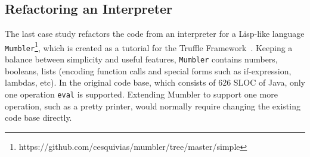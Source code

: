 \begin{comment}
\subsection{Refactoring a Compiler}
The last case study applies our approach to a larger code base of a simple
one-pass compiler for \lstinline{C0} (a subset of \lstinline{C}). This compiler
is a handwritten, monolithic compiler used for educational purposes at Aarhus
University, Denmark\footnote{Source code available at
  http://cs.au.dk/~mis/dOvs/Czero.java}. \lstinline{C0} is restricted to
integers, several control structures and function declaration/definition and
basic I/O statements. All the code (including parsing, code generation for
various structures, error handling) is entangled in one big file. Following our
approach with \mixin, we refactored the code to several smaller interfaces
(including \lstinline{Constants}, \lstinline{MemberFields}, interfaces for
parsing different structures, etc). After the refactoring, the new code does not
reduce code as previous case studies. SLOC for original code without comments
and blank lines is 828, while ours is 830 (for fair comparison, we put all
interfaces into one file when calculating SLOC). However, the case study shows
two things: Classless Java can be applied to real code base such as compilers;
code becomes more modular without the sacrifice of code amount/simplicity.
\marco{Why we do not cite the result of the former study? the one with object algebraes
where the number of lines grown quite a while?}
\end{comment}

\subsection{Refactoring an Interpreter}\label{subsec:int}
The last case study refactors the code from an interpreter for
a Lisp-like language
\lstinline{Mumbler}\footnote{https://github.com/cesquivias/mumbler/tree/master/simple},
which is created as a tutorial for the Truffle
Framework~\cite{wurthinger2013one}.  Keeping a balance between
simplicity and useful features, \lstinline{Mumbler} contains numbers,
booleans, lists (encoding function calls and special forms such as
if-expression, lambdas, etc). In the original code base, which
consists of 626 SLOC of Java, only one operation \texttt{eval} is
supported. Extending Mumbler to support one more operation, such as a
pretty printer, would normally require changing the existing code base
directly.

